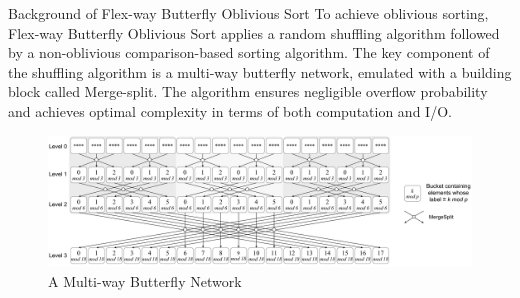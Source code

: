 \documentclass[final,hyperref={pdfpagelabels=false}]{beamer}
\begin{document}
\begin{frame}
\begin{columns}[t]
\begin{column}{.25\linewidth}
      \begin{block}{Background of Flex-way Butterfly Oblivious Sort}
        To achieve oblivious sorting, Flex-way Butterfly Oblivious Sort applies a random shuffling algorithm followed by a non-oblivious comparison-based sorting algorithm. The key component of the shuffling algorithm is a multi-way butterfly network, emulated with a building block called Merge-split. The algorithm ensures negligible overflow probability and achieves optimal complexity in terms of both computation and I/O.
        \begin{figure}
          \includegraphics[width=\linewidth]{assets/multi-way-butterfly.png}
          \caption{A Multi-way Butterfly Network}
        \end{figure}
      \end{block}

    \end{column}





\end{columns}
\end{frame}
\end{document}
